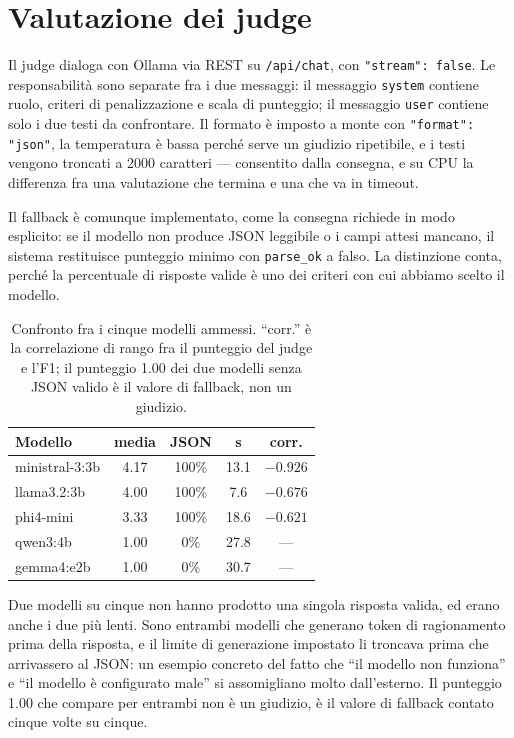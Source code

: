 \documentclass[10pt,a4paper,twocolumn]{article}
\begin{document}
\section{Valutazione dei judge}
\label{sec:judge}

Il judge dialoga con Ollama via REST su \texttt{/api/chat}, con
\texttt{"stream": false}. Le responsabilità sono separate fra i due messaggi:
il messaggio \texttt{system} contiene ruolo, criteri di penalizzazione e scala
di punteggio; il messaggio \texttt{user} contiene solo i due testi da
confrontare. Il formato è imposto a monte con \texttt{"format": "json"}, la
temperatura è bassa perché serve un giudizio ripetibile, e i testi vengono
troncati a 2000 caratteri --- consentito dalla consegna, e su CPU la differenza
fra una valutazione che termina e una che va in timeout.

Il fallback è comunque implementato, come la consegna richiede in modo
esplicito: se il modello non produce JSON leggibile o i campi attesi mancano,
il sistema restituisce punteggio minimo con \texttt{parse\_ok} a falso. La
distinzione conta, perché la percentuale di risposte valide è uno dei criteri
con cui abbiamo scelto il modello.

\begin{table}[htbp]
\centering
\footnotesize
\setlength{\tabcolsep}{3.5pt}
\begin{tabular}{lcccc}
\toprule
\textbf{Modello} & \textbf{media} & \textbf{JSON} & \textbf{s} & \textbf{corr.} \\
\midrule
ministral-3:3b & 4.17 & 100\% & 13.1 & $-0.926$ \\
llama3.2:3b    & 4.00 & 100\% & 7.6  & $-0.676$ \\
phi4-mini      & 3.33 & 100\% & 18.6 & $-0.621$ \\
qwen3:4b       & 1.00 & 0\%   & 27.8 & --- \\
gemma4:e2b     & 1.00 & 0\%   & 30.7 & --- \\
\bottomrule
\end{tabular}
\caption{Confronto fra i cinque modelli ammessi. ``corr.'' è la
correlazione di rango fra il punteggio del judge e l'F1; il punteggio 1.00 dei
due modelli senza JSON valido è il valore di fallback, non un giudizio.}
\label{tab:judge}
\end{table}

Due modelli su cinque non hanno prodotto una singola risposta valida, ed erano
anche i due più lenti. Sono entrambi modelli che generano token di ragionamento
prima della risposta, e il limite di generazione impostato li troncava prima che
arrivassero al JSON: un esempio concreto del fatto che ``il modello non
funziona'' e ``il modello è configurato male'' si assomigliano molto
dall'esterno. Il punteggio 1.00 che compare per entrambi non è un giudizio, è il
valore di fallback contato cinque volte su cinque.
\end{document}
